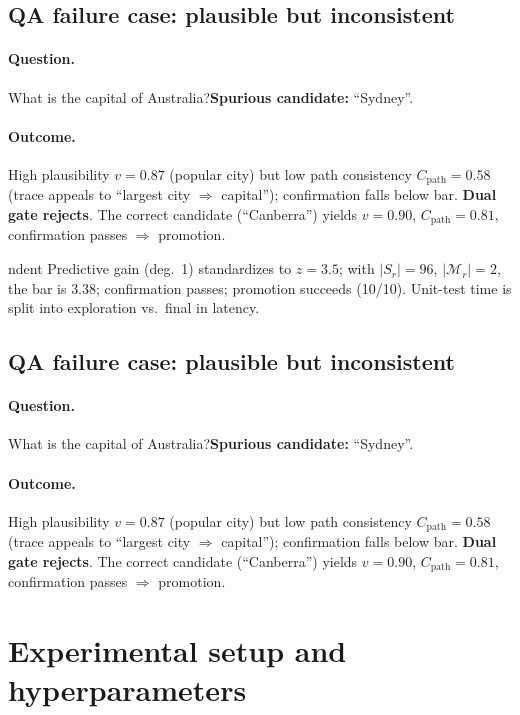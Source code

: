 \documentclass{article}
\begin{document}
\subsection{QA failure case: plausible but inconsistent}
\paragraph{Question.} What is the capital of Australia?\quad \textbf{Spurious candidate:} ``Sydney''.
\paragraph{Outcome.} High plausibility $v{=}0.87$ (popular city) but low path consistency $C_{\text{path}}{=}0.58$ (trace appeals to ``largest city $\Rightarrow$ capital''); confirmation falls below bar. \textbf{Dual gate rejects}. The correct candidate (``Canberra'') yields $v{=}0.90$, $C_{\text{path}}{=}0.81$, confirmation passes $\Rightarrow$ promotion.


ndent Predictive gain (deg.\ 1) standardizes to $z{=}3.5$; with $|S_r|{=}96$, $|\mathcal{M}_r|{=}2$, the bar is $3.38$; confirmation passes; promotion succeeds (10/10). Unit-test time is split into exploration vs.\ final in latency.

\subsection{QA failure case: plausible but inconsistent}
\paragraph{Question.} What is the capital of Australia?\quad \textbf{Spurious candidate:} ``Sydney''.
\paragraph{Outcome.} High plausibility $v{=}0.87$ (popular city) but low path consistency $C_{\text{path}}{=}0.58$ (trace appeals to ``largest city $\Rightarrow$ capital''); confirmation falls below bar. \textbf{Dual gate rejects}. The correct candidate (``Canberra'') yields $v{=}0.90$, $C_{\text{path}}{=}0.81$, confirmation passes $\Rightarrow$ promotion.


\section{Experimental setup and hyperparameters}\label{app:setup}
\end{document}
